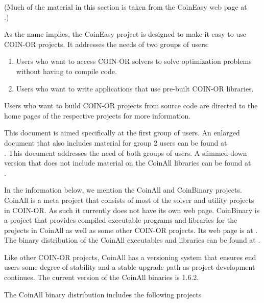 
(Much of the material in this section is taken from the CoinEasy web page at\\
{\tt\UrlCoinEasy}.)


As the name implies, the CoinEasy project is designed to make it easy to use COIN-OR projects. It addresses the needs of two groups of users:

\begin{enumerate}

\item Users who want to access COIN-OR solvers to solve optimization problems without having to compile code.

\item Users who want to write applications that use pre-built COIN-OR libraries. 
\end{enumerate}

Users who want to build COIN-OR projects from source code are directed to the home pages of the respective projects for more information.


\ifruncode
This document is aimed specifically at the first group of users. An enlarged document that also includes material for group 2 users can be found at\\
{\tt\UrlCoinAllLibsPdf}.
\else
This document addresses the need of both groups of users. A slimmed-down version that does not include material on the CoinAll libraries can be found at\\
{\tt\UrlCoinAllBinaryPdf}.
\fi

In the information below, we mention the CoinAll and ​CoinBinary  ​ projects.  
CoinAll is  a meta project that consists of most of the solver and utility projects in COIN-OR. 
As such it currently does not have its own web page. 
CoinBinary is a project that provides compiled executable programs and libraries for the projects in CoinAll as well as some other COIN-OR projects. 
Its web page is at {\tt\UrlCoinBinary}. The binary distribution of the CoinAll executables and libraries can be found at {\tt\UrlCoinAllDownload}.

Like other COIN-OR projects, CoinAll has a versioning system that ensures end users some degree of stability 
and a stable upgrade path as project development continues. The current  version of the CoinAll binaries is 1.6.2.

The CoinAll binary distribution includes the following projects

